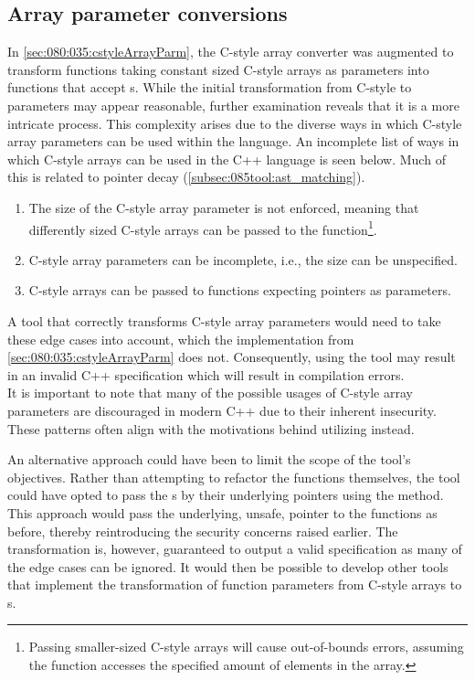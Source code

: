 \subsection{Array parameter conversions}\label{subsec:095disc:arrayParm}
In \cref{sec:080:035:cstyleArrayParm}, the C-style array converter was augmented to transform functions taking constant sized C-style arrays as parameters into functions that accept s.
While the initial transformation from C-style to  parameters may appear reasonable, further examination reveals that it is a more intricate process.
This complexity arises due to the diverse ways in which C-style array parameters can be used within the language.
An incomplete list of ways in which C-style arrays can be used in the C++ language is seen below.
Much of this is related to pointer decay (\cref{subsec:085tool:ast_matching}).
\vspace*{-0.75em}
\begin{enumerate}
    \item The size of the C-style array parameter is not enforced, meaning that differently sized C-style arrays can be passed to the function\footnote{
        Passing smaller-sized C-style arrays will cause out-of-bounds errors, assuming the function accesses the specified amount of elements in the array.
    }.
    \item C-style array parameters can be incomplete, i.e., the size can be unspecified.
    \item C-style arrays can be passed to functions expecting pointers as parameters.
\end{enumerate}
\vspace*{-0.75em}
A tool that correctly transforms C-style array parameters would need to take these edge cases into account, which the implementation from \cref{sec:080:035:cstyleArrayParm} does not.
Consequently, using the tool may result in an invalid C++ specification which will result in compilation errors.\\
It is important to note that many of the possible usages of C-style array parameters are discouraged in modern C++ due to their inherent insecurity. 
These patterns often align with the motivations behind utilizing  instead.

An alternative approach could have been to limit the scope of the tool's objectives.
Rather than attempting to refactor the functions themselves, the tool could have opted to pass the s by their underlying pointers using the  method. This approach would pass the underlying, unsafe, pointer to the functions as before, thereby reintroducing the security concerns raised earlier.
The transformation is, however, guaranteed to output a valid specification as many of the edge cases can be ignored.
It would then be possible to develop other tools that implement the transformation of function parameters from C-style arrays to s.

